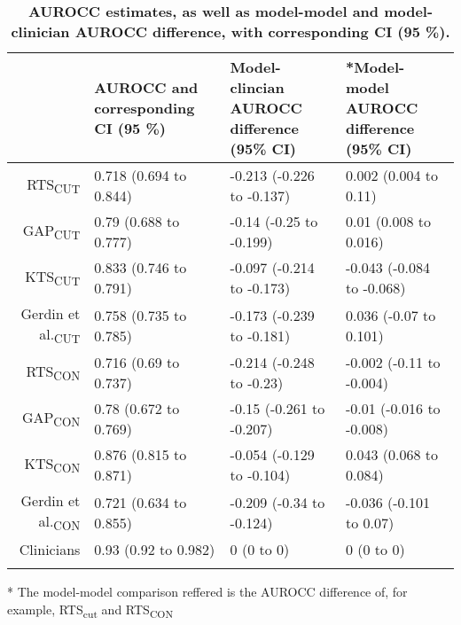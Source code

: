 \begin{table}[!ht]
\centering
\caption{\bf AUROCC estimates, as well as model-model and model-clinician AUROCC difference, with corresponding CI (95 \%).} 
\label{table:auc}
\begin{adjustbox}{max width = \linewidth} 
\begin{threeparttable} 
\begin{tabular} 
{rlll}
   & AUROCC and corresponding CI (95 \%) & Model-clincian AUROCC difference (95\% CI) & *Model-model AUROCC difference (95\% CI) \\ 
  \midrule
RTS\textsubscript{CUT} & 0.718 (0.694 to 0.844) & -0.213 (-0.226 to -0.137) & 0.002 (0.004 to 0.11) \\ 
  GAP\textsubscript{CUT} & 0.79 (0.688 to 0.777) & -0.14 (-0.25 to -0.199) & 0.01 (0.008 to 0.016) \\ 
  KTS\textsubscript{CUT} & 0.833 (0.746 to 0.791) & -0.097 (-0.214 to -0.173) & -0.043 (-0.084 to -0.068) \\ 
  Gerdin et al.\textsubscript{CUT} & 0.758 (0.735 to 0.785) & -0.173 (-0.239 to -0.181) & 0.036 (-0.07 to 0.101) \\ 
  RTS\textsubscript{CON} & 0.716 (0.69 to 0.737) & -0.214 (-0.248 to -0.23) & -0.002 (-0.11 to -0.004) \\ 
  GAP\textsubscript{CON} & 0.78 (0.672 to 0.769) & -0.15 (-0.261 to -0.207) & -0.01 (-0.016 to -0.008) \\ 
  KTS\textsubscript{CON} & 0.876 (0.815 to 0.871) & -0.054 (-0.129 to -0.104) & 0.043 (0.068 to 0.084) \\ 
  Gerdin et al.\textsubscript{CON} & 0.721 (0.634 to 0.855) & -0.209 (-0.34 to -0.124) & -0.036 (-0.101 to 0.07) \\ 
  Clinicians & 0.93 (0.92 to 0.982) & 0 (0 to 0) & 0 (0 to 0) \\ 
   \bottomrule
\addlinespace 
\end{tabular} 
\begin{tablenotes} \footnotesize 
\item[*] The model-model comparison reffered is the AUROCC difference of, for example, RTS\textsubscript{cut} and RTS\textsubscript{CON} 
\end{tablenotes} 
\end{threeparttable} 
\end{adjustbox}
\end{table}

